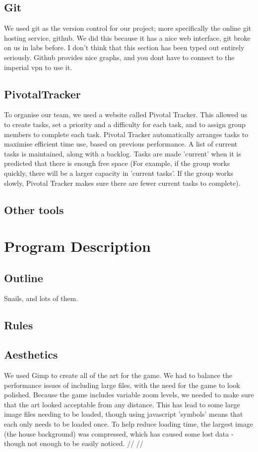 \documentclass{article}
\begin{document}
\subsection{Git}
We used git as the version control for our project; more specifically the online git hosting service, github. We did this because it has a nice web interface, git broke on us in labs before. I don't think that this section has been typed out entirely seriously. Github provides nice graphs, and you dont have to connect to the imperial vpn to use it.
\subsection{PivotalTracker}
To organise our team, we used a website called Pivotal Tracker. This allowed us to create tasks, set a priority and a difficulty for each task, and to assign group members to complete each task. Pivotal Tracker automatically arranges tasks to maximise efficient time use, based on previous performance. A list of current tasks is maintained, along with a backlog. Tasks are made 'current' when it is predicted that there is enough free space (For example, if the group works quickly, there will be a larger capacity in 'current tasks'. If the group works slowly, Pivotal Tracker makes sure there are fewer current tasks to complete).
\subsection{Other tools}

\section{Program Description}
\subsection{Outline}
Snails, and lots of them.
\subsection{Rules}
\subsection{Aesthetics}
We used Gimp to create all of the art for the game. We had to balance the performance issues of including large files, with the need for the game to look polished. Because the game includes variable zoom levels, we needed to make sure that the art looked acceptable from any distance. This has lead to some large image files needing to be loaded, though using javascript 'symbols' means that each only needs to be loaded once. To help reduce loading time, the largest image (the house background) was compressed, which has caused some lost data - though not enough to be easily noticed. // // 
\end{document}

